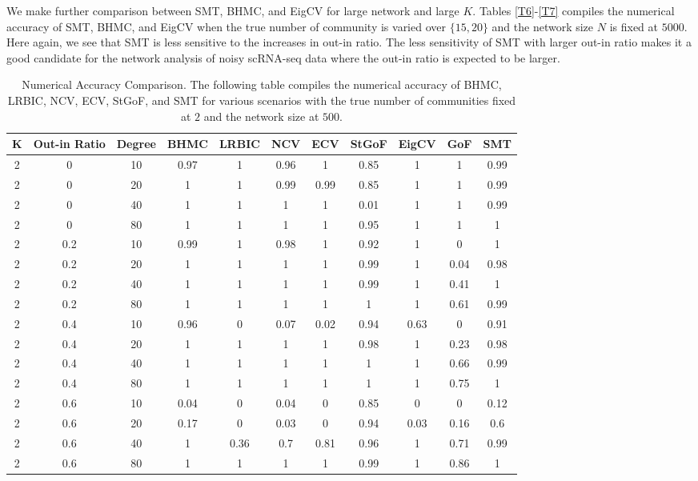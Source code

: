 \documentclass[11pt]{article}
\begin{document}
We make further comparison between SMT, BHMC, and EigCV for large network and large $K$. Tables \ref{T6}-\ref{T7} compiles the numerical accuracy of SMT, BHMC, and EigCV when the true number of community is varied over $\{15, 20\}$ and the network size $N$ is fixed at $5000$. Here again, we see that SMT is less sensitive to the increases in out-in ratio. The less sensitivity of SMT with larger out-in ratio makes it a good candidate for the network analysis of noisy scRNA-seq data where the out-in ratio is expected to be larger.  


\begin{table}[H]
\caption{Numerical Accuracy Comparison. The following table compiles the numerical accuracy of BHMC, LRBIC, NCV, ECV, StGoF, and SMT for various scenarios with the true number of communities fixed at $2$ and the network size at $500$.}\label{T3}
\centering
\begin{tabular}{|c| c | c | c| c | c | c | c | c| c| c|}
\hline
K & Out-in Ratio & Degree & BHMC & LRBIC & NCV & ECV & StGoF & EigCV & GoF & SMT 
\\
\hline
2 & 0 & 10 & 0.97 & 1 & 0.96 & 1 & 0.85 & 1 & 1 & 0.99 \\
2 & 0 & 20 & 1 & 1 & 0.99 & 0.99 & 0.85 & 1 & 1 & 0.99\\
2 & 0 & 40 & 1 & 1 & 1 & 1 & 0.01 & 1 & 1 & 0.99 \\
2 & 0 & 80 & 1 & 1 & 1 & 1 & 0.95 & 1 & 1 & 1 \\
\hline
2 & 0.2 & 10 & 0.99 & 1 & 0.98 & 1 & 0.92 & 1 & 0 & 1 \\
2 & 0.2 & 20 & 1 & 1 & 1 & 1 & 0.99 & 1 & 0.04 & 0.98\\
2 & 0.2 & 40 & 1 & 1 & 1 & 1 & 0.99 & 1 & 0.41 & 1 \\
2 & 0.2 & 80 & 1 & 1 & 1 & 1 & 1 & 1 & 0.61 & 0.99 \\
\hline
2 & 0.4 & 10 & 0.96 & 0 & 0.07 & 0.02 & 0.94 & 0.63 & 0 & 0.91 \\
2 & 0.4 & 20 & 1 & 1 & 1 & 1 & 0.98 & 1 & 0.23 & 0.98\\
2 & 0.4 & 40 & 1 & 1 & 1 & 1 & 1 & 1 & 0.66 & 0.99 \\
2 & 0.4 & 80 & 1 & 1 & 1 & 1 & 1 & 1 & 0.75 & 1 \\
\hline
2 & 0.6 & 10 & 0.04 & 0 & 0.04 & 0 & 0.85 & 0 & 0 & 0.12 \\
2 & 0.6 & 20 & 0.17 & 0 & 0.03 & 0 & 0.94 & 0.03 & 0.16 & 0.6\\
2 & 0.6 & 40 & 1 & 0.36 & 0.7 & 0.81 & 0.96 & 1 & 0.71 & 0.99 \\
2 & 0.6 & 80 & 1 & 1 & 1 & 1 & 0.99 & 1 & 0.86 & 1 \\
\hline
\end{tabular}
\end{table}
\end{document}
